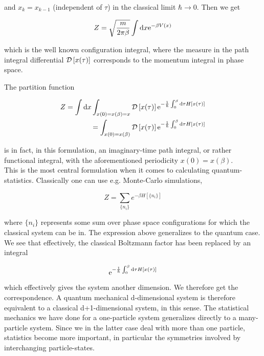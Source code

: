 and $x_{k} = x_{k-1}$ (independent of $\tau$) in the classical limit $\hbar \to 0$. Then we get 

\begin{equation*}
    Z = \sqrt{\frac{m}{2\pi \beta}} \int \dd x \mathrm{e}^{-\beta V(x)}
\end{equation*}

which is the well known configuration integral, where the measure in the path integral differential $\mathcal{D} \left[x(\tau)\right]$ corresponds to the momentum integral in phase space. 

The partition function

\begin{align*}
    Z = \int \dd x  \int_{x(0) = x(\beta) = x} \mathcal{D} \left[x(\tau)\right] \mathrm{e}^{-\frac{1}{\hbar}\int_{0}^{\beta} \dd \tau H\left[x(\tau)\right]} \\ = \int_{x(0) = x(\beta)} \mathcal{D} \left[x(\tau)\right] \mathrm{e}^{-\frac{1}{\hbar}\int_{0}^{\beta} \dd \tau H\left[x(\tau)\right]}
\end{align*}

is in fact, in this formulation, an imaginary-time path integral, or rather functional integral, with the aforementioned periodicity $x(0) = x(\beta)$.  \\ 

This is the most central formulation when it comes to calculating quantum-statistics. Classically one can use e.g. Monte-Carlo simulations, 

\begin{equation*}
    Z = \sum_{\{n_{i}\}}e^{-\beta H \left[ \{n_{i}\}\right]}
\end{equation*}

where $\{n_{i}\}$ represents some sum over phase space configurations for which the classical system can be in. The expression above generalizes to the quantum case. We see that effectively, the classical Boltzmann factor has been replaced by an integral 

\begin{equation*}
    \mathrm{e}^{-\frac{1}{\hbar}\int_{0}^{\beta} \dd \tau H\left[x(\tau)\right]}
\end{equation*}

which effectively gives the system another dimension. We therefore get the correspondence. A quantum mechanical d-dimensional system is therefore equivalent to a classical d+1-dimensional system, in this sense. The statistical mechanics we have done for a one-particle system generalizes directly to a many-particle system. Since we in the latter case deal with more than one particle, statistics become more important, in particular the symmetries involved by interchanging particle-states. 

